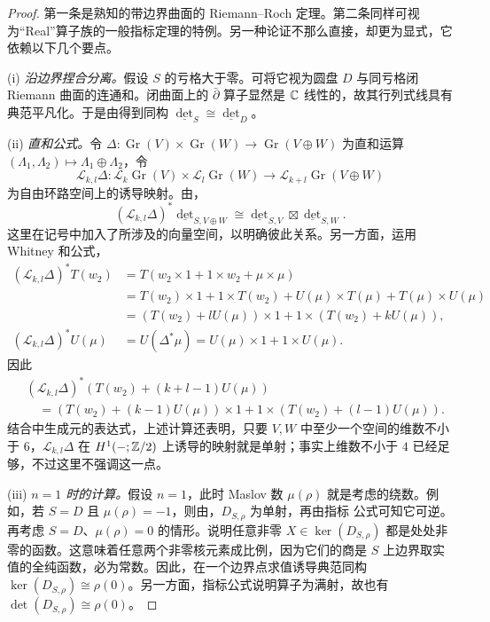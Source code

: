 \begin{proof}
第一条是熟知的带边界曲面的 Riemann–Roch 定理。第二条同样可视为“Real”算子族的一般指标定理的特例。另一种论证不那么直接，却更为显式，它依赖以下几个要点。

\noindent(i) \emph{沿边界捏合分离。}假设 $S$ 的亏格大于零。可将它视为圆盘 $D$ 与同亏格闭 Riemann 曲面的连通和。闭曲面上的 $\bar\partial$ 算子显然是 $\mathbb C$ 线性的，故其行列式线具有典范平凡化。于是由得到同构 $\underline{\det}_S\cong\underline{\det}_D$。

\noindent(ii) \emph{直和公式。}令 $\Delta:\operatorname{Gr}(V)\times\operatorname{Gr}(W)\to\operatorname{Gr}(V\oplus W)$ 为直和运算 $(\Lambda_1,\allowbreak \Lambda_2)\mapsto\Lambda_1\oplus\Lambda_2$，令
\[
\mathcal L_{k,l}\Delta:\mathcal L_k\operatorname{Gr}(V)\times\mathcal L_l\operatorname{Gr}(W)\longrightarrow\mathcal L_{k+l}\operatorname{Gr}(V\oplus W)
\]
为自由环路空间上的诱导映射。由，
\[
(\mathcal L_{k,l}\Delta)^*\underline{\det}_{S,V\oplus W}\cong\underline{\det}_{S,V}\boxtimes\underline{\det}_{S,W}.
\]
这里在记号中加入了所涉及的向量空间，以明确彼此关系。另一方面，运用 Whitney 和公式，
\[
\begin{aligned}
(\mathcal L_{k,l}\Delta)^*T(w_2)
&=T(w_2\times1+1\times w_2+\mu\times\mu)\\
&=T(w_2)\times1+1\times T(w_2)+U(\mu)\times T(\mu)+T(\mu)\times U(\mu)\\
&=(T(w_2)+lU(\mu))\times1+1\times(T(w_2)+kU(\mu)),\\
(\mathcal L_{k,l}\Delta)^*U(\mu)
&=U(\Delta^*\mu)=U(\mu)\times1+1\times U(\mu).
\end{aligned}
\]
因此
\[
\begin{aligned}
&(\mathcal L_{k,l}\Delta)^*(T(w_2)+(k+l-1)U(\mu))\\
&\quad=(T(w_2)+(k-1)U(\mu))\times1+1\times(T(w_2)+(l-1)U(\mu)).
\end{aligned}
\]
结合中生成元的表达式，上述计算还表明，只要 $V,\allowbreak W$ 中至少一个空间的维数不小于 $6$，$\mathcal L_{k,\allowbreak l}\Delta$ 在 $H^1(-;\mathbb Z/2)$ 上诱导的映射就是单射；事实上维数不小于 $4$ 已经足够，不过这里不强调这一点。

\noindent(iii) \emph{$n=1$ 时的计算。}假设 $n=1$，此时 Maslov 数 $\mu(\rho)$ 就是考虑的绕数。例如，若 $S=D$ 且 $\mu(\rho)=-1$，则由，$D_{S,\allowbreak \rho}$ 为单射，再由指标
公式可知它可逆。再考虑 $S=D$、$\mu(\rho)=0$ 的情形。说明任意非零 $X\in\ker(D_{S,\allowbreak \rho})$ 都是处处非零的函数。这意味着任意两个非零核元素成比例，因为它们的商是 $S$ 上边界取实值的全纯函数，必为常数。因此，在一个边界点求值诱导典范同构 $\ker(D_{S,\allowbreak \rho})\cong\rho(0)$。另一方面，指标公式说明算子为满射，故也有 $\det(D_{S,\allowbreak \rho})\cong\rho(0)$。


\end{proof}
